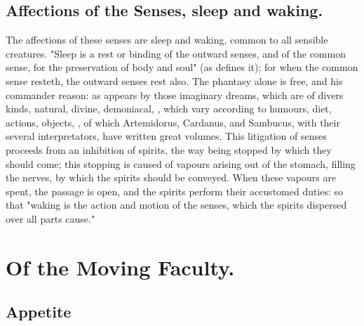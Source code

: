 \subsection{Affections of the Senses, sleep and waking.}

The affections of these senses are sleep and waking, common to all sensible
creatures. "Sleep is a rest or binding of the outward senses, and of the common
sense, for the preservation of body and soul" (as \Scaliger{}
defines it); for when the common sense resteth, the outward
senses rest also. The phantasy alone is free, and his commander reason: as
appears by those imaginary dreams, which are of divers kinds, natural, divine,
demoniacal, \etc{}, which vary according to humours, diet, actions, objects,
\etc{}, of which Artemidorus, Cardanus, and Sambucus, with their several
interpretators, have written great volumes. This litigation of senses proceeds
from an inhibition of spirits, the way being stopped by which they should come;
this stopping is caused of vapours arising out of the stomach, filling the
nerves, by which the spirits should be conveyed. When these vapours are spent,
the passage is open, and the spirits perform their accustomed duties: so that
"waking is the action and motion of the senses, which the spirits dispersed
over all parts cause."

\section{Of the Moving Faculty.}

\subsection{Appetite}

